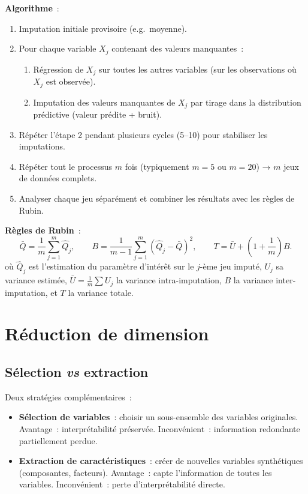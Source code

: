 \documentclass[a4paper,11pt]{article}
\theoremstyle{definition}
\theoremstyle{remark}
\begin{document}
\textbf{Algorithme}~:
\begin{enumerate}
  \item Imputation initiale provisoire (e.g.\ moyenne).
  \item Pour chaque variable $X_j$ contenant des valeurs manquantes~:
    \begin{enumerate}
      \item Régression de $X_j$ sur toutes les autres variables
        (sur les observations où $X_j$ est observée).
      \item Imputation des valeurs manquantes de $X_j$ par tirage
        dans la distribution prédictive (valeur prédite + bruit).
    \end{enumerate}
  \item Répéter l'étape 2 pendant plusieurs cycles (5--10) pour
    stabiliser les imputations.
  \item Répéter tout le processus $m$ fois (typiquement $m=5$ ou
    $m=20$) → $m$ jeux de données complets.
  \item Analyser chaque jeu séparément et combiner les résultats
    avec les règles de Rubin.
\end{enumerate}

\textbf{Règles de Rubin}~:
\[
\bar{Q} = \frac{1}{m}\sum_{j=1}^m \hat{Q}_j,\qquad
B = \frac{1}{m-1}\sum_{j=1}^m (\hat{Q}_j - \bar{Q})^2,\qquad
T = \bar{U} + \left(1 + \frac{1}{m}\right)B.
\]
où $\hat{Q}_j$ est l'estimation du paramètre d'intérêt sur le
$j$-ème jeu imputé, $U_j$ sa variance estimée,
$\bar{U} = \frac{1}{m}\sum U_j$ la variance intra-imputation,
$B$ la variance inter-imputation, et $T$ la variance totale.

\section{Réduction de dimension}

\subsection{Sélection \textit{vs} extraction}

Deux stratégies complémentaires~:
\begin{itemize}
  \item \textbf{Sélection de variables}~: choisir un sous-ensemble des
    variables originales. Avantage~: interprétabilité préservée.
    Inconvénient~: information redondante partiellement perdue.
  \item \textbf{Extraction de caractéristiques}~: créer de nouvelles
    variables synthétiques (composantes, facteurs). Avantage~: capte
    l'information de toutes les variables. Inconvénient~: perte
    d'interprétabilité directe.
\end{itemize}
\end{document}
